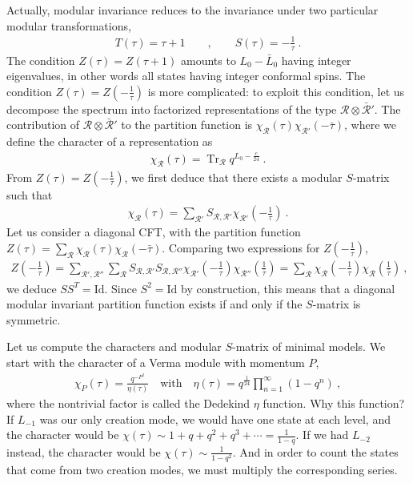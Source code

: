 \documentclass[12pt, a4paper]{article}
\theoremstyle{break}
\begin{document}
Actually, modular invariance reduces to the invariance under two particular modular transformations,
\begin{align}
 T(\tau) = \tau + 1 \qquad , \qquad S(\tau) = -\frac{1}{\tau}\ .
\end{align}
The condition $Z(\tau)=Z(\tau+1)$ amounts to $L_0-\bar{L}_0$ having integer eigenvalues, in other words all states having integer conformal spins.
The condition $Z(\tau)=Z(-\frac{1}{\tau})$ is more complicated: to exploit this condition, let us decompose the spectrum into factorized representations of the type $\mathcal{R}\otimes \bar{\mathcal{R}}'$. 
The contribution of $\mathcal{R}\otimes \bar{\mathcal{R}}'$ to the partition function is $\chi_{\mathcal{R}}(\tau) \chi_{\mathcal{R}'}(-\bar\tau)$, where we define the character of a representation as
\begin{align}
 \chi_\mathcal{R}(\tau) = \operatorname{Tr}_\mathcal{R} q^{L_0-\frac{c}{24}}\ .
\end{align}
From $Z(\tau)=Z(-\frac{1}{\tau})$, we first deduce that there exists a modular $S$-matrix such that 
\begin{align}
 \chi_\mathcal{R}(\tau) = \sum_{\mathcal{R}'} S_{\mathcal{R},\mathcal{R}'} \chi_{\mathcal{R}'}(-\tfrac{1}{\tau})\ .
\end{align}
Let us consider a diagonal CFT, with the partition function $Z(\tau)=\sum_\mathcal{R} \chi_\mathcal{R}(\tau)\chi_{\mathcal{R}}(-\bar{\tau})$.
Comparing two expressions for $Z(-\frac{1}{\tau})$, 
\begin{align}
Z(-\tfrac{1}{\tau}) = \sum_{\mathcal{R}',\mathcal{R}''} \sum_{\mathcal{R}} S_{\mathcal{R},\mathcal{R}'} S_{\mathcal{R},\mathcal{R}''} \chi_{\mathcal{R}'}(-\tfrac{1}{\tau}) \chi_{\mathcal{R}''}(\tfrac{1}{\bar\tau}) = \sum_{\mathcal{R}} \chi_{\mathcal{R}}(-\tfrac{1}{\tau}) \chi_{\mathcal{R}}(\tfrac{1}{\bar\tau})\ ,
\end{align}
we deduce $SS^T=\text{Id}$. Since $S^2=\text{Id}$ by construction, this means that a diagonal modular invariant partition function exists if and only if the $S$-matrix is symmetric.

Let us compute the characters and modular $S$-matrix of minimal models. We start with the character of a Verma module with momentum $P$,
\begin{align}
 \chi_P(\tau) = \frac{q^{-P^2}}{\eta(\tau)} \quad \text{with} \quad \eta(\tau) = q^{\frac{1}{24}} \prod_{n=1}^\infty (1-q^n)\ ,
\end{align}
where the nontrivial factor is called the Dedekind $\eta$ function. Why this function? If $L_{-1}$ was our only creation mode, we would have one state at each level, and the character would be $\chi(\tau)\sim 1+q+q^2+q^3+\cdots = \frac{1}{1-q}$. If we had $L_{-2}$ instead, the character would be $\chi(\tau)\sim \frac{1}{1-q^2}$. And in order to count the states that come from two creation modes, we must multiply the corresponding series.
\end{document}

